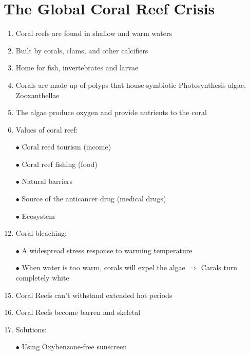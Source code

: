 \documentclass{report}
\begin{document}
\section{The Global Coral Reef Crisis}
\begin{enumerate}
    \item Coral reefs are found in shallow and warm waters
    \item Built by corals, clams, and other calcifiers
    \item Home for fish, invertebrates and larvae
    \item Corals are made up of polyps that house symbiotic Photosynthesis algae, Zooxanthellae
    \item The algae produce oxygen and provide nutrients to the coral
    \item Values of coral reef:
    \item [$\bullet$]Coral reed tourism (income)
    \item [$\bullet$]Coral reef fishing (food)
    \item [$\bullet$]Natural barriers
    \item [$\bullet$]Source of the anticancer drug (medical drugs)
    \item [$\bullet$]Ecosystem
    \item Coral bleaching:
    \item [$\bullet$]A widespread stress response to warming temperature
    \item [$\bullet$]When water is too warm, corals will expel the algae $\Rightarrow$ Carals turn completely white
    \item Coral Reefs can't withstand extended hot periods
    \item Coral Reefs become barren and skeletal
    \item Solutions:
    \item [$\bullet$]Using Oxybenzone-free sunscreen
\end{enumerate}
\end{document}
